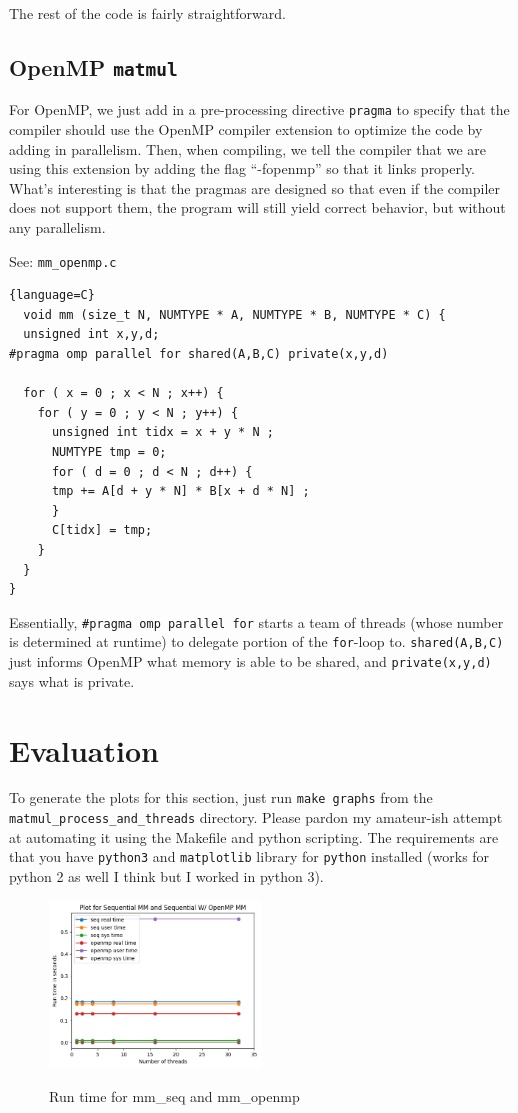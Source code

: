 \documentclass{article}
\begin{document}
The rest of the code is fairly straightforward.
\subsection{OpenMP \texttt{matmul}}
For OpenMP, we just add in a pre-processing directive \texttt{pragma} to specify that the compiler should use the OpenMP compiler extension to optimize the code by adding in parallelism. Then, when compiling, we tell the compiler that we are using this extension by adding the flag ``-fopenmp'' so that it links properly.  What's interesting is that the pragmas are designed so that even if the compiler does not support them, the program will still yield correct behavior, but without any parallelism.

See: \texttt{mm\_openmp.c}
\begin{lstlisting}{language=C}
  void mm (size_t N, NUMTYPE * A, NUMTYPE * B, NUMTYPE * C) {
  unsigned int x,y,d;
#pragma omp parallel for shared(A,B,C) private(x,y,d)

  for ( x = 0 ; x < N ; x++) {
    for ( y = 0 ; y < N ; y++) {
      unsigned int tidx = x + y * N ;
      NUMTYPE tmp = 0;
      for ( d = 0 ; d < N ; d++) {
	  tmp += A[d + y * N] * B[x + d * N] ;
      }
      C[tidx] = tmp;
    }
  }
}
\end{lstlisting}

Essentially, \texttt{\#pragma omp parallel for} starts a team of threads (whose number is determined at runtime) to delegate portion of the \texttt{for}-loop to. \texttt{shared(A,B,C)} just informs OpenMP what memory is able to be shared, and \texttt{private(x,y,d)} says what is private.

\section{Evaluation}
To generate the plots for this section, just run \texttt{make graphs} from the \texttt{matmul\_process\_and\_threads} directory. Please pardon my amateur-ish attempt at automating it using the Makefile and python scripting. The requirements are that you have \texttt{python3} and \texttt{matplotlib} library for \texttt{python} installed (works for python 2 as well I think but I worked in python 3).

\begin{figure}[!h]
\centering  \includegraphics[width=0.5\textwidth]{others}
\label{fig: mm_seq and mm_openmp}
\caption{Run time for mm\_seq and mm\_openmp}
\end{figure}
\end{document}
